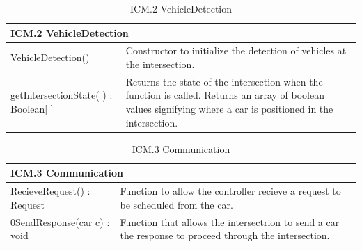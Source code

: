 \documentclass [10pt]{article}
\begin{document}
\begin{longtable}{| p{ } | p{ } | }\caption{ICM.2 VehicleDetection} \\\hline  
 \multicolumn{2}{|l|}{\textbf {ICM.2 VehicleDetection}}\\ \hline
 
\cellcolor{tableCell}VehicleDetection()& \cellcolor{tableCell}Constructor to initialize the detection of vehicles at the intersection. \\ \hline 

getIntersectionState( ) : Boolean[ ] & Returns the state of the intersection when the function is called. Returns an array of boolean values signifying where a car is positioned in the intersection. \\ \hline 



\end{longtable}

\begin{longtable}{| p{ } | p{ } | }\caption{ICM.3 Communication} \\\hline  
 \multicolumn{2}{|l|}{\textbf {ICM.3 Communication}}\\ \hline
 
\cellcolor{tableCell}RecieveRequest() : Request& \cellcolor{tableCell}Function to allow the controller recieve a request to be scheduled from the car.\\ \hline 


0SendResponse(car c) : void & Function that allows the intersectrion to send a car the response to proceed through the intersection. \\ \hline




\end{longtable}
\end{document}
